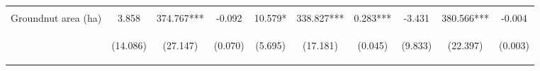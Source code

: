 \begin{center}
\begin{tabular}{lccccccccc}
\vspace{4pt} & \begin{footnotesize}[0.240]\end{footnotesize} & \begin{footnotesize}[0.119]\end{footnotesize} & \begin{footnotesize}[0.326]\end{footnotesize} & \begin{footnotesize}[0.367]\end{footnotesize} & \begin{footnotesize}[0.411]\end{footnotesize} & \begin{footnotesize}[0.434]\end{footnotesize} & \begin{footnotesize}[0.985]\end{footnotesize} & \begin{footnotesize}[0.146]\end{footnotesize} & \begin{footnotesize}[0.104]\end{footnotesize} \\
Groundnut area (ha) & 3.858 & 374.767*** & -0.092 & 10.579* & 338.827*** & 0.283*** & -3.431 & 380.566*** & -0.004 \\
 & \begin{footnotesize}(14.086)\end{footnotesize} & \begin{footnotesize}(27.147)\end{footnotesize} & \begin{footnotesize}(0.070)\end{footnotesize} & \begin{footnotesize}(5.695)\end{footnotesize} & \begin{footnotesize}(17.181)\end{footnotesize} & \begin{footnotesize}(0.045)\end{footnotesize} & \begin{footnotesize}(9.833)\end{footnotesize} & \begin{footnotesize}(22.397)\end{footnotesize} & \begin{footnotesize}(0.003)\end{footnotesize} \\

\end{tabular}
\end{center}
